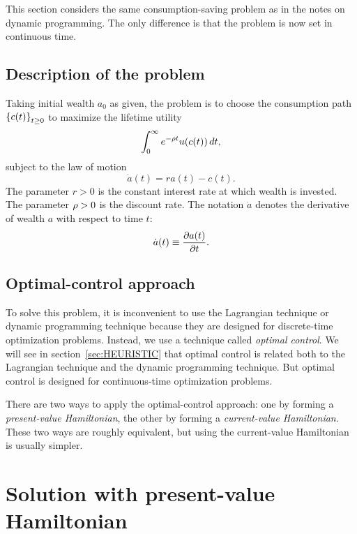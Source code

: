 \documentclass[letterpaper, 11pt, leqno]{article}
\begin{document}
This section considers the same consumption-saving problem as in the notes on dynamic programming. The only difference is that the problem is now set in continuous time. 

\subsection{Description of the problem}

Taking initial wealth $a_{0}$ as given, the problem is to choose the consumption path $\left\lbrace c(t) \right\rbrace_{t\ge 0}$ to maximize the lifetime utility
\begin{equation}
\int_{0}^{\infty}e^{-\rho t} u(c(t))\,dt,
\label{e:cont}\end{equation}
subject to the law of motion
\begin{equation}
\dot{a}(t) = r a(t)-c(t).
\label{e:LAW}\end{equation} 
The parameter $r>0$ is the constant interest rate at which wealth is invested. The parameter $\rho>0$ is the discount rate. The notation $\dot{a}$ denotes the derivative of wealth $a$ with respect to time $t$:
\begin{equation*}
\dot{a}(t)\equiv \pd{a(t)}{t}.
\end{equation*} 

\subsection{Optimal-control approach}

To solve this problem, it is inconvenient to use the Lagrangian technique or dynamic programming technique because they are designed for discrete-time optimization problems. Instead, we use a technique called \textit{optimal control}. We will see in section~\ref{sec:HEURISTIC} that optimal control is related both to the Lagrangian technique and the dynamic programming technique. But optimal control is designed for continuous-time optimization problems. 

There are two ways to apply the optimal-control approach: one by forming a \textit{present-value Hamiltonian}, the other by forming a \textit{current-value Hamiltonian}. These two ways are roughly equivalent, but using the current-value Hamiltonian is usually simpler.

\section{Solution with present-value Hamiltonian}
\end{document}
